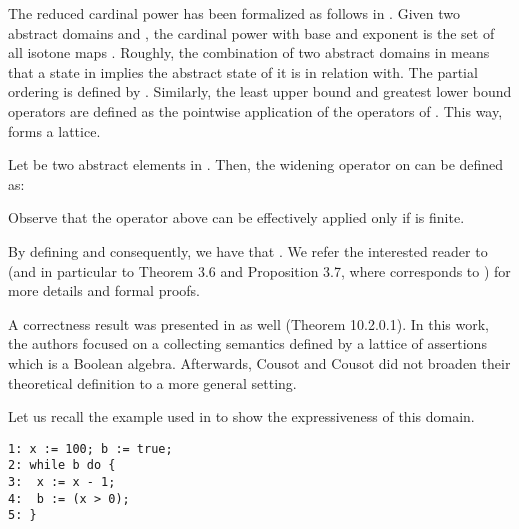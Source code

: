 \documentclass[submission,copyright,creativecommons]{eptcs}
\begin{document}
The reduced cardinal power has been formalized as follows in \cite{CC79}. Given two abstract domains  and , the cardinal power  with base  and exponent  is the set of all isotone maps . Roughly, the combination of two abstract domains in  means that a state in  implies the abstract state of  it is in relation with. The partial ordering  is defined by . Similarly, the least upper bound and greatest lower bound operators are defined as the pointwise application of the operators of . This way,  forms a lattice.

Let  be two abstract elements in . Then, the widening operator  on  can be defined as:

Observe that the operator above can be effectively applied only if  is finite.

By defining  and  consequently, we have that . We refer the interested reader to \cite{GR99} (and in particular to Theorem 3.6 and Proposition 3.7, where  corresponds to ) for more details and formal proofs.



A correctness result was presented in \cite{CC79} as well (Theorem 10.2.0.1). In this work, the authors focused on a collecting semantics defined by a lattice of assertions which is a Boolean algebra. Afterwards, Cousot and Cousot did not broaden their theoretical definition to a more general setting.

Let us recall the example used in \cite{CC79} to show the expressiveness of this domain.

\lstset{numbers=none}
\begin{lstlisting}
1: x := 100; b := true;
2: while b do {
3: 	x := x - 1;
4: 	b := (x > 0);
5: }
\end{lstlisting} 
\end{document}
